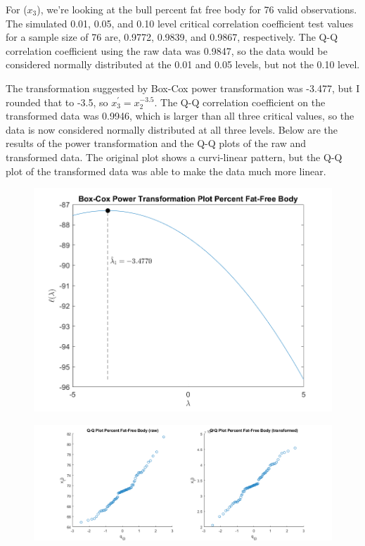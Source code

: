 For ($x_{3}$), we're looking at the bull percent fat free body for 76 valid observations. The simulated 0.01, 0.05, and 0.10 level critical correlation coefficient test values for a sample size of 76 are, 0.9772, 0.9839, and 0.9867, respectively. The Q-Q correlation coefficient using the raw data was 0.9847, so the data would be considered normally distributed at the 0.01 and 0.05 levels, but not the 0.10 level.

The transformation suggested by Box-Cox power transformation was -3.477, but I rounded that to -3.5, so $x_{3}^{\prime} = x_{2}^{-3.5}$.
The Q-Q correlation coefficient on the transformed data was 0.9946, which is larger than all three critical values, so the data is now considered normally distributed at all three levels.
Below are the results of the power transformation and the Q-Q plots of the raw and transformed data.
The original plot shows a curvi-linear pattern, but the Q-Q plot of the transformed data was able to make the data much more linear.

\begin{center}
    \begin{figure}[H]
        \centering
        \includegraphics[scale=0.6]{./matlab/chapter-4/sol4.38.power.3.png}
    \end{figure}
\end{center}

\begin{center}
    \begin{figure}[H]
        \centering
        \includegraphics[scale=0.4]{./matlab/chapter-4/sol4.38.qq.3.png}
    \end{figure}
\end{center}

